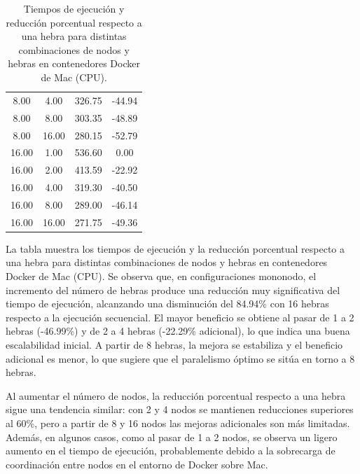 \begin{table}[ht]
\begin{tabular}{|c|c|c|c|}
        8.00           & 4.00            & 326.75              & -44.94                         \\
        8.00           & 8.00            & 303.35              & -48.89                         \\
        8.00           & 16.00           & 280.15              & -52.79                         \\
        16.00          & 1.00            & 536.60              & 0.00                           \\
        16.00          & 2.00            & 413.59              & -22.92                         \\
        16.00          & 4.00            & 319.30              & -40.50                         \\
        16.00          & 8.00            & 289.00              & -46.14                         \\
        16.00          & 16.00           & 271.75              & -49.36                         \\
        \hline
    \end{tabular}
    \caption{Tiempos de ejecución y reducción porcentual respecto a una hebra para distintas combinaciones de nodos y hebras en contenedores Docker de Mac (CPU).}
    \label{tab:thread_sweep_mac_docker_time}
\end{table}

La tabla muestra los tiempos de ejecución y la reducción porcentual respecto a una hebra para distintas combinaciones de nodos y hebras en contenedores Docker de Mac (CPU). Se observa que, en configuraciones mononodo, el incremento del número de hebras produce una reducción muy significativa del tiempo de ejecución, alcanzando una disminución del 84.94\% con 16 hebras respecto a la ejecución secuencial. El mayor beneficio se obtiene al pasar de 1 a 2 hebras (-46.99\%) y de 2 a 4 hebras (-22.29\% adicional), lo que indica una buena escalabilidad inicial. A partir de 8 hebras, la mejora se estabiliza y el beneficio adicional es menor, lo que sugiere que el paralelismo óptimo se sitúa en torno a 8 hebras.

Al aumentar el número de nodos, la reducción porcentual respecto a una hebra sigue una tendencia similar: con 2 y 4 nodos se mantienen reducciones superiores al 60\%, pero a partir de 8 y 16 nodos las mejoras adicionales son más limitadas. Además, en algunos casos, como al pasar de 1 a 2 nodos, se observa un ligero aumento en el tiempo de ejecución, probablemente debido a la sobrecarga de coordinación entre nodos en el entorno de Docker sobre Mac.

